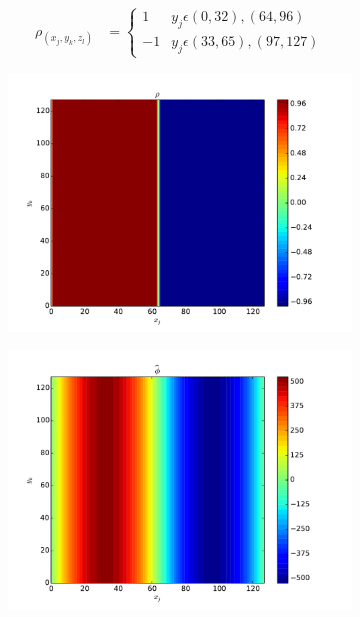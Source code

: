 	\begin{align}
		\rho_(x_j,y_k,z_l) &= \begin{cases} 1  & y_j \epsilon (0, 32), (64,96)\\ -1  & y_j \epsilon (33, 65), (97,127) \end{cases}
	\end{align}

	\begin{figure}
		\centering
			\begin{subfigure}[b]{0.6\textwidth}
				\includegraphics[width = \textwidth]{figures/verification/analytical/heaviside/rho.pdf}
			\end{subfigure}
			\begin{subfigure}[b]{0.6\textwidth}
				\includegraphics[width = \textwidth]{figures/verification/analytical/heaviside/numerical.pdf}

\end{subfigure}
\end{figure}
